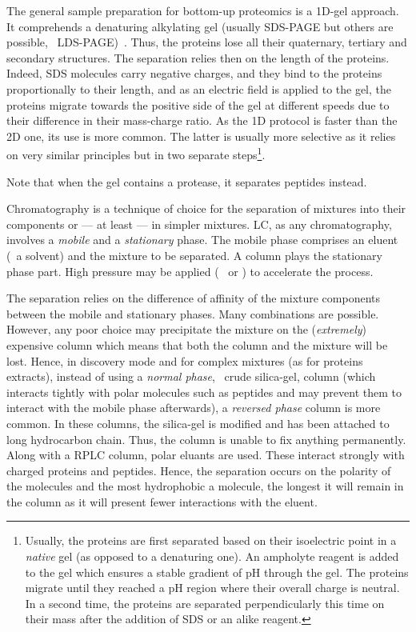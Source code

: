 The general sample preparation for bottom-up proteomics is a 1D-gel approach.
It comprehends a denaturing alkylating gel (usually \gls{SDS-PAGE} but others are
possible, \eg\ \gls{LDS-PAGE})~. Thus, the proteins lose
all their quaternary, tertiary and secondary structures. The separation relies
then on the length of the proteins. Indeed, \gls{SDS} molecules carry negative
charges, and they bind to the proteins proportionally to their length, and as an
electric field is applied to the gel, the proteins migrate towards the positive
side of the gel at different speeds due to their difference in their mass-charge
ratio. As the 1D protocol is faster than the 2D one, its use is more common. The latter is
usually more selective as it relies on very similar principles but in two separate
steps\footnote{Usually, the proteins are first separated based on their
isoelectric point in a \emph{native} gel (as opposed to a denaturing one).
An \gls{ampholyte} reagent is added to the gel which ensures a stable
gradient of \gls{pH} through the gel. The proteins migrate until they reached a
\gls{pH} region where their overall charge is neutral. In a second time, the
proteins are separated perpendicularly this time on their mass after the addition
of \gls{SDS} or an alike reagent.}.\mybr\

Note that when the gel contains a protease, it separates peptides instead.\mybr\


\vspace{-0.5mm}
Chromatography is a technique of choice for the separation of mixtures into their
components or --- at least --- in simpler mixtures. \gls{LC}, as any
chromatography, involves a \emph{mobile} and a \emph{stationary} phase.
The mobile phase comprises an eluent (\ie\ a solvent) and the mixture to be
separated. A column plays the stationary phase part.
High pressure may be applied (\eg\  or )
to accelerate the process.\mybr\

\vspace{-0.5mm}
The separation relies on the difference of affinity of the mixture components
between the mobile and stationary phases. Many combinations are possible. However,
any poor choice may precipitate the mixture on the (\emph{extremely})
expensive column which means that both the column and the mixture will be lost.
Hence, in discovery mode and for complex mixtures (as for proteins extracts),
instead of using a \emph{normal phase}, \ie\ crude silica-gel, column (which
interacts tightly with polar molecules such as peptides and may prevent them to
interact with the mobile phase afterwards), a \emph{reversed phase} column
is more common. In these columns, the silica-gel is modified and has been
attached to long hydrocarbon chain. Thus, the column is unable to fix anything
permanently. Along with a \gls{RPLC} column, polar eluants are used. These
interact strongly with charged proteins and peptides. Hence, the separation
occurs on the polarity of the molecules and the most hydrophobic a molecule,
the longest it will remain in the column as it will present fewer interactions
with the eluent.\mybr\

